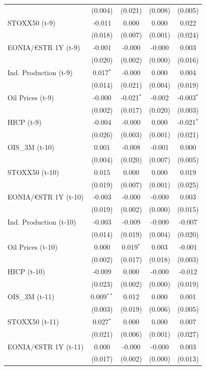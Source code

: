 \begin{longtable}[t]{lcccc}
 & (0.004) & (0.021) & (0.008) & (0.005)\\
STOXX50 (t-9) & -0.011 & 0.000 & 0.000 & 0.022\\
 & (0.018) & (0.007) & (0.001) & (0.024)\\
EONIA/€STR 1Y (t-9) & -0.001 & -0.000 & -0.000 & 0.003\\
 & (0.020) & (0.002) & (0.000) & (0.016)\\
Ind. Production (t-9) & 0.017$^{*}$ & -0.000 & 0.000 & 0.004\\
 & (0.014) & (0.021) & (0.004) & (0.019)\\
Oil Prices (t-9) & -0.000 & -0.021$^{*}$ & -0.002 & -0.003$^{*}$\\
 & (0.002) & (0.017) & (0.020) & (0.003)\\
HICP (t-9) & -0.004 & -0.000 & 0.000 & -0.021$^{*}$\\
 & (0.026) & (0.003) & (0.001) & (0.021)\\
OIS\_3M (t-10) & 0.001 & -0.008 & -0.001 & 0.000\\
 & (0.004) & (0.020) & (0.007) & (0.005)\\
STOXX50 (t-10) & 0.015 & 0.000 & 0.000 & 0.019\\
 & (0.019) & (0.007) & (0.001) & (0.025)\\
EONIA/€STR 1Y (t-10) & -0.003 & -0.000 & -0.000 & 0.003\\
 & (0.019) & (0.002) & (0.000) & \vphantom{1} (0.015)\\
Ind. Production (t-10) & -0.003 & -0.009 & -0.000 & -0.007\\
 & (0.014) & (0.019) & (0.004) & (0.020)\\
Oil Prices (t-10) & 0.000 & 0.019$^{*}$ & 0.003 & -0.001\\
 & (0.002) & (0.017) & (0.018) & (0.003)\\
HICP (t-10) & -0.009 & 0.000 & -0.000 & -0.012\\
 & (0.023) & (0.002) & (0.000) & (0.019)\\
OIS\_3M (t-11) & 0.009$^{**}$ & 0.012 & 0.000 & 0.001\\
 & (0.003) & (0.019) & (0.006) & (0.005)\\
STOXX50 (t-11) & 0.027$^{*}$ & 0.000 & 0.000 & 0.007\\
 & (0.021) & (0.006) & (0.001) & (0.027)\\
EONIA/€STR 1Y (t-11) & 0.000 & -0.000 & -0.000 & 0.003\\
 & (0.017) & (0.002) & (0.000) & (0.013)\\

\end{longtable}
